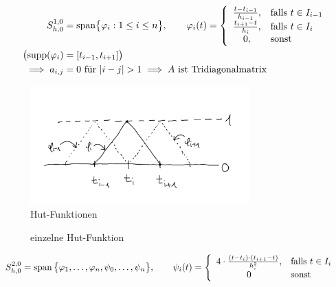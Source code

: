 \begin{align*}
	S^{1,0}_{h,0}&=\text{span}\big\lbrace\varphi_i:1\leq i\leq n\big\rbrace,\qquad
\varphi_i(t)=\left\lbrace\begin{array}{cl}
\frac{t-t_{i-1}}{h_{i-1}}, &\falls t\in I_{i-1}\\
\frac{t_{i+1}-t}{h_i}, &\falls t\in I_i\\
0, &\sonst
\end{array}\right.\\
\big(\text{supp}(\varphi_i) &= [t_{i-1}, t_{i+1}]\big)\\
\implies a_{i,j}&=0\text{ für }|i-j|>1\implies A\text{ ist Tridiagonalmatrix}
\end{align*}

\begin{figure}[!ht]
	\begin{center}
		\includegraphics[width=0.75\textwidth]{pics/Sketch1.png}
		\caption{Hut-Funktionen}
		\label{AbbHutFunktionen}
	\end{center}
\end{figure}

\begin{figure}[!ht]
\begin{center}

\caption{einzelne Hut-Funktion}
\label{AbbPhiHat}
\end{center}
\end{figure}

\begin{align*}
S_{h,0}^{2,0}&=\operatorname{span}\big\lbrace\varphi_1,\ldots,\varphi_n,\psi_0,\ldots,\psi_n\big\rbrace,\qquad
\psi_i(t)=\left\lbrace\begin{array}{cl}
4\cdot\frac{(t-t_i)\cdot(t_{i+1}-t)}{h_i^2}, &\text{falls } t\in I_i\\
0 &\text{sonst }
\end{array}\right.
\end{align*}

